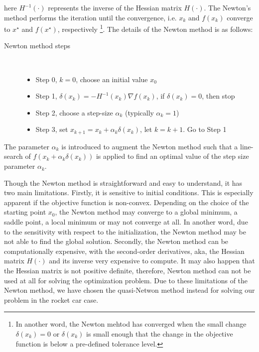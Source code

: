 \documentclass  [
  paper    = a4,
  BCOR     = 10mm,
  twoside,
  fontsize = 12pt,
  fleqn,
  toc      = bibnumbered,
  toc      = listofnumbered,
  numbers  = noendperiod,
  headings = normal,
  listof   = leveldown,
  version  = 3.03
]                                       {scrreprt}
\newcommand{\<}{\langle}
\renewcommand{\>}{\rangle}
\begin{document}
   here $ H^{-1}(\cdot)$ represents the inverse of the Hessian matrix $H(\cdot)$. The Newton's method performs the iteration until the convergence, i.e. $x_k$ and $f(x_k)$ converge to $x^\star$ and $f(x^\star)$, respectively \footnote{In another word, the Newton mehtod has converged when the small change $\delta(x_k) =0$ or $\delta(x_k)$ is small enough that the change in the objective function is below a pre-defined tolerance level.}. The details of the Newton method is as follows: 
   \begin{description}
   	\item[Newton method steps]\ 
   	\begin{itemize}
   		\item Step 0, $k=0$, choose an initial value $x_0$ 
   		\item Step 1, $\delta(x_k)  =- H^{-1}(x_k)\nabla f(x_k)$, if $\delta(x_k) =0$, then stop
   		\item Step 2, choose a step-size $\alpha_k$ (typically $\alpha_k =1$)
   		\item Step 3, set $x_{k+1}  = x_k + \alpha_k \delta(x_k) $, let $k= k+1$. Go to Step 1
   	\end{itemize}
   \end{description}
   
   The parameter $\alpha_k$ is introduced to augment the Newton method such that a line-search of $f(x_k + \alpha_k \delta(x_k))$ is applied to find an optimal value of the step size parameter $\alpha_k$. 
   
   Though the Newton method is straightforward and easy to understand, it has two main limitations. Firstly, it is sensitive to initial conditions. This is especially apparent if the objective function is non-convex. Depending on the choice of the starting point $x_0$, the Newton method may converge to a global minimum, a saddle point, a local minimum or may not converge at all. In another word, due to the sensitivity with respect to the initialization, the Newton method may be not able to find the global solution. Secondly, the Newton method can be computationally expensive, with the second-order derivatives, aka, the Hessian matrix $H(\cdot)$ and its inverse very expensive to compute. It may also happen that the Hessian matrix is not positive definite, therefore, Newton method can not be used at all for solving the optimization problem. Due to these limitations of the Newton method, we have chosen the quasi-Netwon method instead for solving our problem in the rocket car case. 
   
\end{document}

